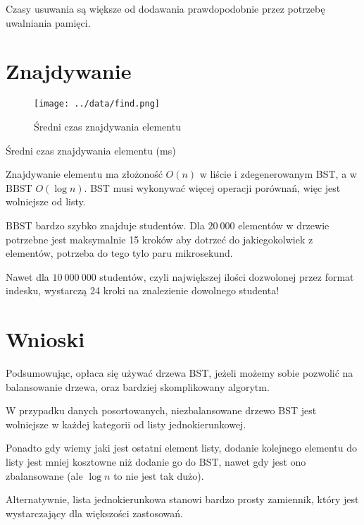 \documentclass[11pt,twocolumn]{article}
\begin{document}
Czasy usuwania są większe od dodawania prawdopodobnie przez potrzebę uwalniania pamięci.



\section{Znajdywanie}

\begin{figure}[h]
	\texttt{[image: ../data/find.png]}
	\caption{Średni czas znajdywania elementu \label{find}}
\end{figure}

\begin{table}[h]
	\centering
	\caption{Średni czas znajdywania elementu (ms)}
\end{table}

Znajdywanie elementu ma złożoność $O(n)$ w liście i zdegenerowanym BST, a w BBST $O(\log n)$. BST musi wykonywać więcej operacji porównań, więc jest wolniejsze od listy.

BBST bardzo szybko znajduje studentów. Dla $20\ 000$ elementów w drzewie potrzebne jest maksymalnie 15 kroków aby dotrzeć do jakiegokolwiek z elementów, potrzeba do tego tylo paru mikrosekund. 

Nawet dla $10\ 000\ 000$ studentów, czyli największej ilości dozwolonej przez format indesku, wystarczą 24 kroki na znalezienie dowolnego studenta!



\section{Wnioski}

Podsumowując, opłaca się używać drzewa BST, jeżeli możemy sobie pozwolić na balansowanie drzewa, oraz bardziej skomplikowany algorytm. 

W przypadku danych posortowanych, niezbalansowane drzewo BST jest wolniejsze w każdej kategorii od listy jednokierunkowej. 

Ponadto gdy wiemy jaki jest ostatni element listy, dodanie kolejnego elementu do listy jest mniej kosztowne niż dodanie go do BST, nawet gdy jest ono zbalansowane (ale $\log n$ to nie jest tak dużo).

Alternatywnie, lista jednokierunkowa stanowi bardzo prosty zamiennik, który jest wystarczający dla większości zastosowań.
\end{document}
